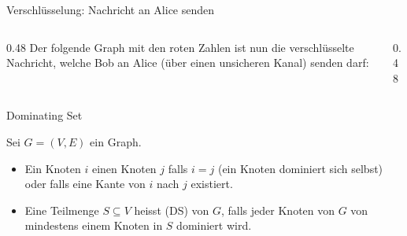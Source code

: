 \begin{frame}{Verschlüsselung: Nachricht an Alice senden}
	\begin{columns}[c,onlytextwidth]
		\begin{column}{0.48\textwidth}
			Der folgende Graph mit den roten Zahlen ist nun die verschlüsselte Nachricht, welche Bob an Alice (über einen unsicheren Kanal) senden darf:
		\end{column}
		\begin{column}{0.48\textwidth}
			\centering
		\end{column}
	\end{columns}
\end{frame}

\begin{frame}[t,label=repetition]{Dominating Set}
	\begin{mydefinition}\label{mydefinition:DominatingSet}
		Sei $G = (V, E)$ ein Graph.
		\begin{itemize}
			\item Ein Knoten $i$  einen Knoten $j$ falls $i = j$ (ein Knoten dominiert sich selbst) oder falls eine Kante von $i$ nach $j$ existiert.
			\item Eine Teilmenge $S\subseteq V$ heisst  (DS) von $G$, falls jeder Knoten von $G$ von mindestens einem Knoten in $S$ dominiert wird.
		\end{itemize}
	\end{mydefinition}
\end{frame}

